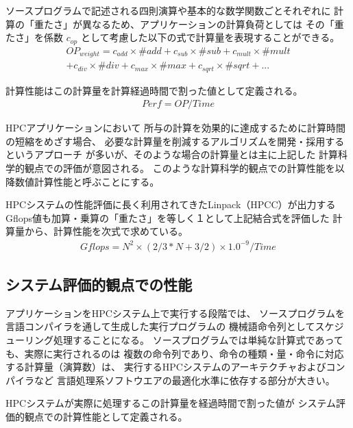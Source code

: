 \documentclass[submit,techrep,noauthor]{ipsj}
\begin{document}
ソースプログラムで記述される四則演算や基本的な数学関数ごとそれぞれに
計算の「重たさ」が異なるため、アプリケーションの計算負荷としては
その「重たさ」を係数
\begin{math} c_{op} \end{math}
として考慮した以下の式で計算量を表現することができる。
\begin{align*}
OP_{weight} =
	c_{add}\times \#add + c_{sub}\times \#sub + c_{mult}\times \#mult \\
	+ c_{div}\times \#div + c_{max}\times \#max + c_{sqrt}\times \#sqrt + ...
\end{align*}

計算性能はこの計算量を計算経過時間で割った値として定義される。
\begin{align*}
Perf = OP / Time	%
\end{align*}

HPCアプリケーションにおいて
所与の計算を効果的に達成するために計算時間の短縮をめざす場合、
必要な計算量を削減するアルゴリズムを開発・採用するというアプローチ
が多いが、そのような場合の計算量とは主に上記した
計算科学的観点での評価が意図される。
このような計算科学的観点での計算性能を以降数値計算性能と呼ぶことにする。

HPCシステムの性能評価に長く利用されてきたLinpack（HPCC）が出力する
Gflops値も加算・乗算の「重たさ」を等しく１として上記結合式を評価した
計算量から、計算性能を次式で求めている。
\begin{align*}
Gflops = N^{2} \times ( 2/3 * N + 3/2 ) \times 1.0^{-9} / Time 
\end{align*}



\subsection {システム評価的観点での性能}
\label{subsection:system-perf}

アプリケーションをHPCシステム上で実行する段階では、
ソースプログラムを言語コンパイラを通して生成した実行プログラムの
機械語命令列としてスケジューリング処理することになる。
ソースプログラムでは単純な計算式であっても、実際に実行されるのは
複数の命令列であり、命令の種類・量・命令に対応する計算量（演算数）は、
実行するHPCシステムのアーキテクチャおよびコンパイラなど
言語処理系ソフトウエアの最適化水準に依存する部分が大きい。

HPCシステムが実際に処理するこの計算量を経過時間で割った値が
システム評価的観点での計算性能として定義される。
\end{document}
